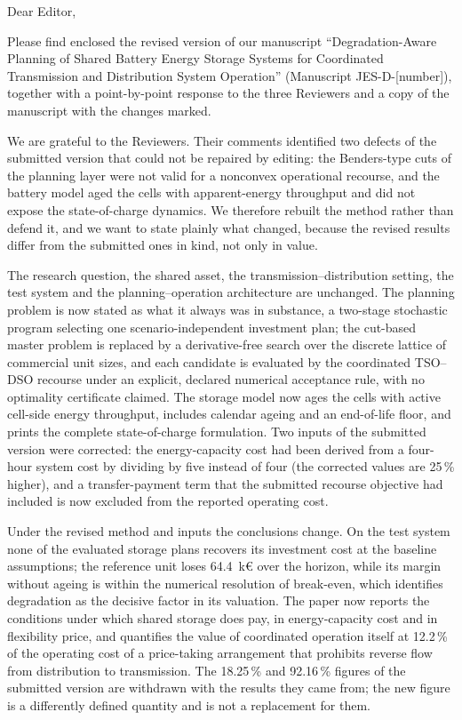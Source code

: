 \documentclass[12pt]{letter}
\begin{document}
\begin{letter}{}

    \opening{Dear Editor,}

    Please find enclosed the revised version of our manuscript ``Degradation-Aware Planning of Shared Battery Energy Storage Systems for Coordinated Transmission and Distribution System Operation'' (Manuscript JES-D-[number]), together with a point-by-point response to the three Reviewers and a copy of the manuscript with the changes marked.

    We are grateful to the Reviewers. Their comments identified two defects of the submitted version that could not be repaired by editing: the Benders-type cuts of the planning layer were not valid for a nonconvex operational recourse, and the battery model aged the cells with apparent-energy throughput and did not expose the state-of-charge dynamics. We therefore rebuilt the method rather than defend it, and we want to state plainly what changed, because the revised results differ from the submitted ones in kind, not only in value.

    The research question, the shared asset, the transmission--distribution setting, the test system and the planning--operation architecture are unchanged. The planning problem is now stated as what it always was in substance, a two-stage stochastic program selecting one scenario-independent investment plan; the cut-based master problem is replaced by a derivative-free search over the discrete lattice of commercial unit sizes, and each candidate is evaluated by the coordinated TSO--DSO recourse under an explicit, declared numerical acceptance rule, with no optimality certificate claimed. The storage model now ages the cells with active cell-side energy throughput, includes calendar ageing and an end-of-life floor, and prints the complete state-of-charge formulation. Two inputs of the submitted version were corrected: the energy-capacity cost had been derived from a four-hour system cost by dividing by five instead of four (the corrected values are 25\,\% higher), and a transfer-payment term that the submitted recourse objective had included is now excluded from the reported operating cost.

    Under the revised method and inputs the conclusions change. On the test system none of the evaluated storage plans recovers its investment cost at the baseline assumptions; the reference unit loses 64.4~k\euro{} over the horizon, while its margin without ageing is within the numerical resolution of break-even, which identifies degradation as the decisive factor in its valuation. The paper now reports the conditions under which shared storage does pay, in energy-capacity cost and in flexibility price, and quantifies the value of coordinated operation itself at 12.2\,\% of the operating cost of a price-taking arrangement that prohibits reverse flow from distribution to transmission. The 18.25\,\% and 92.16\,\% figures of the submitted version are withdrawn with the results they came from; the new figure is a differently defined quantity and is not a replacement for them.


\end{letter}
\end{document}
